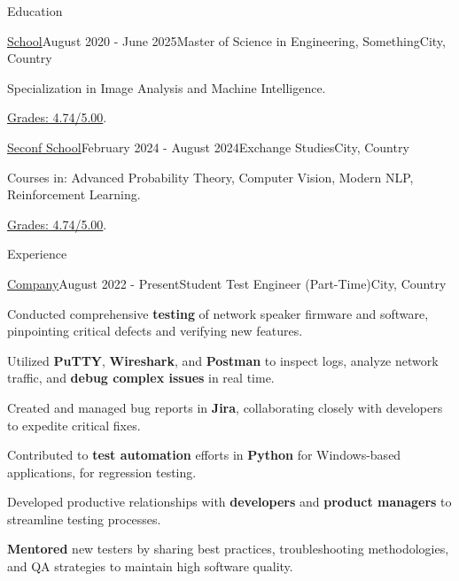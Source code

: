 \documentclass{resume} %
\begin{document}
\begin{rSection}{Education}

\begin{rSubsection}{\underline{School}}{August 2020 - June 2025}{Master of Science in Engineering, Something}{City, Country}
\item Specialization in Image Analysis and Machine Intelligence.

\item \textcolor{blue}{\href{https://Link.com}{Grades: 4.74/5.00}}.
\end{rSubsection}
\vspace{-8pt}
\begin{rSubsection}{\underline{Seconf School}}{February 2024 - August 2024}{Exchange Studies}{City, Country}
\item Courses in: Advanced Probability Theory, Computer Vision, Modern NLP, Reinforcement Learning.
\item \textcolor{blue}{\href{https://Link.com}{Grades: 4.74/5.00}}.
\end{rSubsection}
\end{rSection}
\vspace{-3mm}
\begin{rSection}{Experience}
\begin{rSubsection}
{\underline{Company}}{August 2022 - Present}{Student Test Engineer (Part-Time)}{City, Country} 
\item Conducted comprehensive \textbf{testing} of network speaker firmware and software, pinpointing critical defects and verifying new features. 
\item Utilized \textbf{PuTTY}, \textbf{Wireshark}, and \textbf{Postman} to inspect logs, analyze network traffic, and \textbf{debug complex issues} in real time. 
\item Created and managed bug reports in \textbf{Jira}, collaborating closely with developers to expedite critical fixes. 
\item Contributed to \textbf{test automation} efforts in \textbf{Python} for Windows-based applications, for regression testing.
\item Developed productive relationships with \textbf{developers} and \textbf{product managers} to streamline testing processes. 
\item \textbf{Mentored} new testers by sharing best practices, troubleshooting methodologies, and QA strategies to maintain high software quality. 
\end{rSubsection}

\end{rSection}
\vspace{-3mm}
\end{document}
